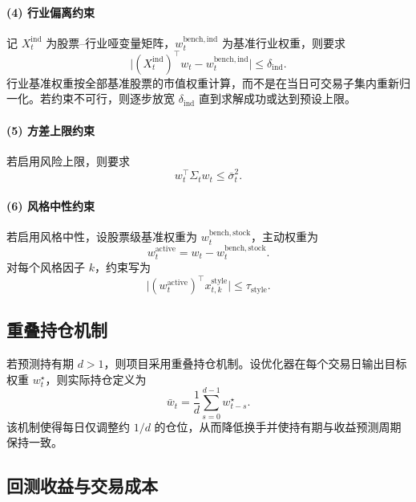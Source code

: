 \documentclass[12pt, a4paper, oneside]{article}
\begin{document}
\paragraph{(4) 行业偏离约束}
记 \(X_t^{\mathrm{ind}}\) 为股票--行业哑变量矩阵，\(w_t^{\mathrm{bench,ind}}\) 为基准行业权重，则要求
\begin{equation}
\big|(X_t^{\mathrm{ind}})^\top w_t - w_t^{\mathrm{bench,ind}}\big| \le \delta_{\mathrm{ind}}.
\end{equation}
行业基准权重按全部基准股票的市值权重计算，而不是在当日可交易子集内重新归一化。若约束不可行，则逐步放宽 \(\delta_{\mathrm{ind}}\) 直到求解成功或达到预设上限。

\paragraph{(5) 方差上限约束}
若启用风险上限，则要求
\begin{equation}
w_t^\top\Sigma_t w_t \le \bar\sigma_t^2.
\end{equation}

\paragraph{(6) 风格中性约束}
若启用风格中性，设股票级基准权重为 \(w_t^{\mathrm{bench,stock}}\)，主动权重为
\begin{equation}
w_t^{\mathrm{active}} = w_t - w_t^{\mathrm{bench,stock}}.
\end{equation}
对每个风格因子 \(k\)，约束写为
\begin{equation}
\big|(w_t^{\mathrm{active}})^\top x_{t,k}^{\mathrm{style}}\big| \le \tau_{\mathrm{style}}.
\end{equation}

\subsection{重叠持仓机制}

若预测持有期 \(d>1\)，则项目采用重叠持仓机制。设优化器在每个交易日输出目标权重 \(w_t^\star\)，则实际持仓定义为
\begin{equation}
\bar w_t = \frac{1}{d}\sum_{s=0}^{d-1}w_{t-s}^\star.
\end{equation}
该机制使得每日仅调整约 \(1/d\) 的仓位，从而降低换手并使持有期与收益预测周期保持一致。

\subsection{回测收益与交易成本}
\end{document}
